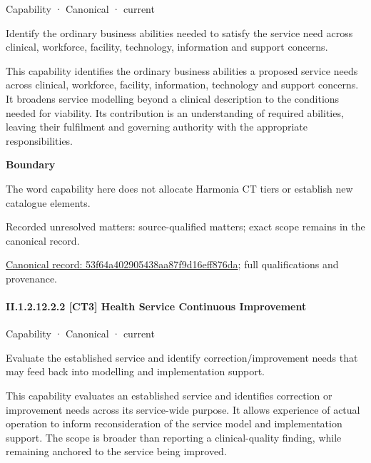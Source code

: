\label{element:53f64a402905438aa87f9d16eff876da}
{\small Capability · Canonical · current}\par

Identify the ordinary business abilities needed to satisfy the service need across clinical, workforce, facility, technology, information and support concerns.



This capability identifies the ordinary business abilities a proposed service needs across clinical, workforce, facility, information, technology and support concerns. It broadens service modelling beyond a clinical description to the conditions needed for viability. Its contribution is an understanding of required abilities, leaving their fulfilment and governing authority with the appropriate responsibilities.



\textbf{Boundary}



The word capability here does not allocate Harmonia CT tiers or establish new catalogue elements.


{\small Recorded unresolved matters: source-qualified matters; exact scope remains in the canonical record.}\par
{\footnotesize \href{../../../../continuum/strategy/capability/53f64a402905438aa87f9d16eff876da.md}{Canonical record: 53f64a402905438aa87f9d16eff876da}; full qualifications and provenance.}\par
\paragraph*{II.1.2.12.2.2 [CT3] Health Service Continuous Improvement}
\label{navigation:II.1.2.12.2.2}

\label{element:b2b2b91b1a094ef1b13ce6870ff9716f}
{\small Capability · Canonical · current}\par

Evaluate the established service and identify correction/improvement needs that may feed back into modelling and implementation support.



This capability evaluates an established service and identifies correction or improvement needs across its service-wide purpose. It allows experience of actual operation to inform reconsideration of the service model and implementation support. The scope is broader than reporting a clinical-quality finding, while remaining anchored to the service being improved.



